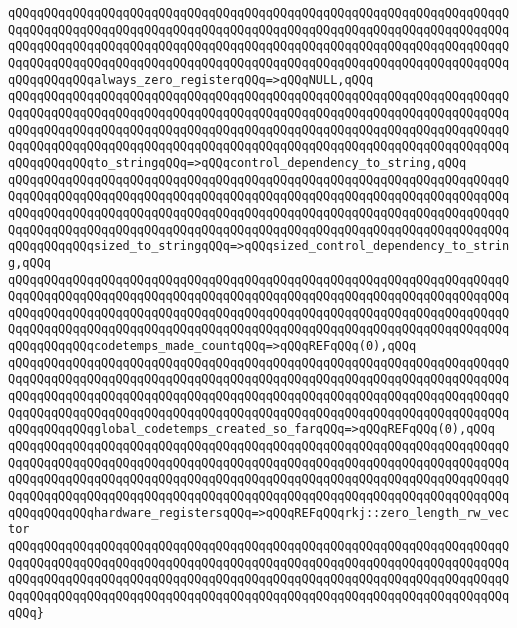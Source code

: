 \verb|qQQqqQQqqQQqqQQqqQQqqQQqqQQqqQQqqQQqqQQqqQQqqQQqqQQqqQQqqQQqqQQqqQQqqQQqqQQqqQQqqQQqqQQqqQQqqQQqqQQqqQQqqQQqqQQqqQQqqQQqqQQqqQQqqQQqqQQqqQQqqQQqqQQqqQQqqQQqqQQqqQQqqQQqqQQqqQQqqQQqqQQqqQQqqQQqqQQqqQQqqQQqqQQqqQQqqQQqqQQqqQQqqQQqqQQqqQQqqQQqqQQqqQQqqQQqqQQqqQQqqQQqqQQqqQQqqQQqqQQqqQQqqQQqqQQqalways_zero_registerqQQq=>qQQqNULL,qQQq|\newline
\verb|qQQqqQQqqQQqqQQqqQQqqQQqqQQqqQQqqQQqqQQqqQQqqQQqqQQqqQQqqQQqqQQqqQQqqQQqqQQqqQQqqQQqqQQqqQQqqQQqqQQqqQQqqQQqqQQqqQQqqQQqqQQqqQQqqQQqqQQqqQQqqQQqqQQqqQQqqQQqqQQqqQQqqQQqqQQqqQQqqQQqqQQqqQQqqQQqqQQqqQQqqQQqqQQqqQQqqQQqqQQqqQQqqQQqqQQqqQQqqQQqqQQqqQQqqQQqqQQqqQQqqQQqqQQqqQQqqQQqqQQqqQQqqQQqqQQqto_stringqQQq=>qQQqcontrol_dependency_to_string,qQQq|\newline
\verb|qQQqqQQqqQQqqQQqqQQqqQQqqQQqqQQqqQQqqQQqqQQqqQQqqQQqqQQqqQQqqQQqqQQqqQQqqQQqqQQqqQQqqQQqqQQqqQQqqQQqqQQqqQQqqQQqqQQqqQQqqQQqqQQqqQQqqQQqqQQqqQQqqQQqqQQqqQQqqQQqqQQqqQQqqQQqqQQqqQQqqQQqqQQqqQQqqQQqqQQqqQQqqQQqqQQqqQQqqQQqqQQqqQQqqQQqqQQqqQQqqQQqqQQqqQQqqQQqqQQqqQQqqQQqqQQqqQQqqQQqqQQqqQQqqQQqsized_to_stringqQQq=>qQQqsized_control_dependency_to_string,qQQq|\newline
\verb|qQQqqQQqqQQqqQQqqQQqqQQqqQQqqQQqqQQqqQQqqQQqqQQqqQQqqQQqqQQqqQQqqQQqqQQqqQQqqQQqqQQqqQQqqQQqqQQqqQQqqQQqqQQqqQQqqQQqqQQqqQQqqQQqqQQqqQQqqQQqqQQqqQQqqQQqqQQqqQQqqQQqqQQqqQQqqQQqqQQqqQQqqQQqqQQqqQQqqQQqqQQqqQQqqQQqqQQqqQQqqQQqqQQqqQQqqQQqqQQqqQQqqQQqqQQqqQQqqQQqqQQqqQQqqQQqqQQqqQQqqQQqqQQqqQQqcodetemps_made_countqQQq=>qQQqREFqQQq(0),qQQq|\newline
\verb|qQQqqQQqqQQqqQQqqQQqqQQqqQQqqQQqqQQqqQQqqQQqqQQqqQQqqQQqqQQqqQQqqQQqqQQqqQQqqQQqqQQqqQQqqQQqqQQqqQQqqQQqqQQqqQQqqQQqqQQqqQQqqQQqqQQqqQQqqQQqqQQqqQQqqQQqqQQqqQQqqQQqqQQqqQQqqQQqqQQqqQQqqQQqqQQqqQQqqQQqqQQqqQQqqQQqqQQqqQQqqQQqqQQqqQQqqQQqqQQqqQQqqQQqqQQqqQQqqQQqqQQqqQQqqQQqqQQqqQQqqQQqqQQqqQQqglobal_codetemps_created_so_farqQQq=>qQQqREFqQQq(0),qQQq|\newline
\verb|qQQqqQQqqQQqqQQqqQQqqQQqqQQqqQQqqQQqqQQqqQQqqQQqqQQqqQQqqQQqqQQqqQQqqQQqqQQqqQQqqQQqqQQqqQQqqQQqqQQqqQQqqQQqqQQqqQQqqQQqqQQqqQQqqQQqqQQqqQQqqQQqqQQqqQQqqQQqqQQqqQQqqQQqqQQqqQQqqQQqqQQqqQQqqQQqqQQqqQQqqQQqqQQqqQQqqQQqqQQqqQQqqQQqqQQqqQQqqQQqqQQqqQQqqQQqqQQqqQQqqQQqqQQqqQQqqQQqqQQqqQQqqQQqqQQqhardware_registersqQQq=>qQQqREFqQQqrkj::zero_length_rw_vector|\newline
\verb|qQQqqQQqqQQqqQQqqQQqqQQqqQQqqQQqqQQqqQQqqQQqqQQqqQQqqQQqqQQqqQQqqQQqqQQqqQQqqQQqqQQqqQQqqQQqqQQqqQQqqQQqqQQqqQQqqQQqqQQqqQQqqQQqqQQqqQQqqQQqqQQqqQQqqQQqqQQqqQQqqQQqqQQqqQQqqQQqqQQqqQQqqQQqqQQqqQQqqQQqqQQqqQQqqQQqqQQqqQQqqQQqqQQqqQQqqQQqqQQqqQQqqQQqqQQqqQQqqQQqqQQqqQQqqQQqqQQqqQQqqQQq}|\newline
